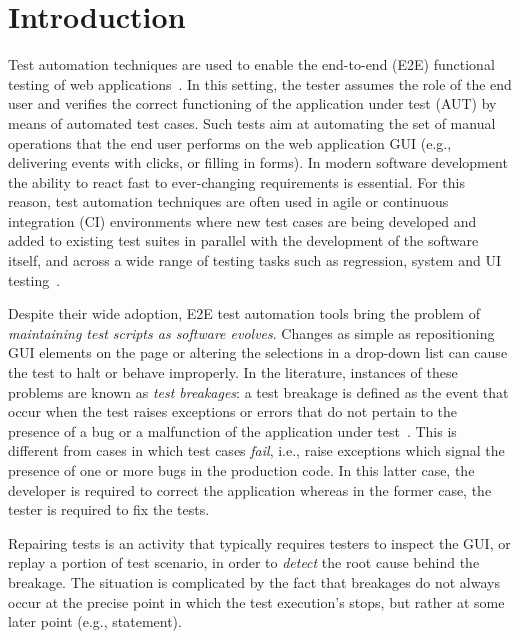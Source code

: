 \section{Introduction}\label{sec:introduction}

Test automation techniques are used to enable the end-to-end (E2E) functional testing of web applications~\cite{DBLP:journals/ac/TonellaRM14}. 
In this setting, the tester assumes the role of the end user and verifies the correct functioning of the application under test (AUT) by means of automated test cases. Such tests aim at automating the set of manual operations that the end user  performs on the web application GUI (e.g., delivering events with clicks, or filling in forms). 
In modern software development the ability to react fast to ever-changing requirements is essential. For this reason, test automation techniques are often used in agile or continuous integration (CI) environments where new test cases are being developed and added to existing test suites in parallel with the development of the software itself, and across a wide range of testing tasks such as regression, system and UI testing~\cite{STVR:STVR121,Fewster,Ramler:2006:EPT:1138929.1138946,Nguyen2014,7381848}.


Despite their wide adoption, E2E test automation tools bring the problem of \textit{maintaining test scripts as software evolves}. Changes as simple as repositioning GUI elements on the page or altering the selections in a drop-down list can cause the test to halt or behave improperly. 
In the literature, instances of these problems are known as \textit{test breakages}: a test breakage is defined as the event that occur when the test raises exceptions or errors that do not pertain to the presence of a bug or a malfunction of the application under test~\cite{Daniel:2011:AGR:2002931.2002937,Daniel:2009:RSR:1747491.1747538,Daniel:2010:TRU:1831708.1831734,Hammoudi-2016-ICST}. 
This is different from cases in which test cases \textit{fail}, i.e., raise exceptions which signal the presence of one or more bugs in the production code. In this latter case, the developer is required to correct the application whereas in the former case, the tester is required to fix the tests. %


Repairing tests is an activity that typically requires testers to inspect the GUI, or replay a portion of test scenario, in order to \textit{detect} the root cause behind the breakage. The situation is complicated by the fact that breakages do not always occur at the precise point in which the test execution's stops, but rather at some later point (e.g., statement).

